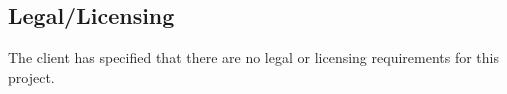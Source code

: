 \subsection{Legal/Licensing}
The client has specified that there are no legal or licensing requirements for this project.